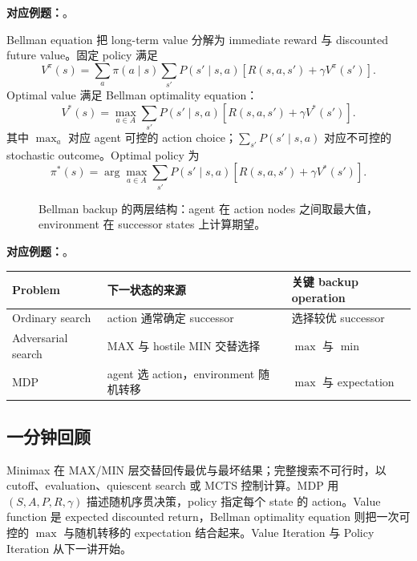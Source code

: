\textbf{对应例题：}。


Bellman equation 把 long-term value 分解为 immediate reward 与 discounted future value。固定 policy 满足
\[
  V^\pi(s)=\sum_a\pi(a\mid s)\sum_{s'}P(s'\mid s,a)
  \left[R(s,a,s')+\gamma V^\pi(s')\right].
\]
Optimal value 满足 Bellman optimality equation：
\[
  \boxed{
  V^*(s)=\max_{a\in A}\sum_{s'}P(s'\mid s,a)
  \left[R(s,a,s')+\gamma V^*(s')\right] }.
\]
其中 $\max_a$ 对应 agent 可控的 action choice；$\sum_{s'}P(s'\mid s,a)$ 对应不可控的 stochastic outcome。Optimal policy 为
\[
  \pi^*(s)=\arg\max_{a\in A}\sum_{s'}P(s'\mid s,a)
  \left[R(s,a,s')+\gamma V^*(s')\right].
\]

\begin{figure}[htbp]
  \centering
  \resizebox{0.98\textwidth}{!}{}
  \caption{Bellman backup 的两层结构：agent 在 action nodes 之间取最大值，environment 在 successor states 上计算期望。}
  \label{fig:sc3000-l03-mdp-backup}
\end{figure}

\textbf{对应例题：}。

\begin{center}
\small
\begin{tabularx}{\textwidth}{@{}lXX@{}}
  \toprule
  Problem & 下一状态的来源 & 关键 backup operation \\
  \midrule
  Ordinary search & action 通常确定 successor & 选择较优 successor \\
  Adversarial search & MAX 与 hostile MIN 交替选择 & $\max$ 与 $\min$ \\
  MDP & agent 选 action，environment 随机转移 & $\max$ 与 expectation \\
  \bottomrule
\end{tabularx}
\end{center}

\subsection{一分钟回顾}

Minimax 在 MAX/MIN 层交替回传最优与最坏结果；完整搜索不可行时，以 cutoff、evaluation、quiescent search 或 MCTS 控制计算。MDP 用 $(S,A,P,R,\gamma)$ 描述随机序贯决策，policy 指定每个 state 的 action。Value function 是 expected discounted return，Bellman optimality equation 则把一次可控的 $\max$ 与随机转移的 expectation 结合起来。Value Iteration 与 Policy Iteration 从下一讲开始。
